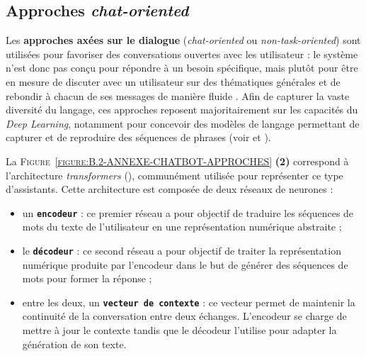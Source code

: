 		
		\subsection{Approches \textit{chat-oriented}}
		\label{annex:B.2.2-ANNEXE-CHATBOTS-APPROCHES-CHAT-ORIENTED}
			
			Les \textbf{approches axées sur le dialogue} (\textit{chat-oriented} ou \textit{non-task-oriented}) sont utilisées pour favoriser des conversations ouvertes avec les utilisateur : le système n'est donc pas conçu pour répondre à un besoin spécifique, mais plutôt pour être en mesure de discuter avec un utilisateur sur des thématiques générales et de rebondir à chacun de ses messages de manière fluide .
			Afin de capturer la vaste diversité du langage, ces approches reposent majoritairement sur les capacités du \textit{Deep Learning}, notamment pour concevoir des modèles de langage permettant de capturer et de reproduire des séquences de phrases (voir \cite{ni-etal:2022:recent-advances-deep} et \cite{kumar-etal:2016:ask-me-anything}).
			
			La \textsc{Figure~\ref{figure:B.2-ANNEXE-CHATBOT-APPROCHES}} \textbf{(2)} correspond à l'architecture \textit{transformers} (\cite{uszkoreit:2017:transformer-novel-neural}), communément utilisée pour représenter ce type d'assistants.
			Cette architecture est composée de deux réseaux de neurones :
			\begin{itemize}
				\item un \textcolor{colorCarrotOrange}{\textbf{\texttt{encodeur}}} :
					ce premier réseau a pour objectif de traduire les séquences de mots du texte de l'utilisateur en une représentation numérique abstraite ;
				\item le \textcolor{colorSilverLakeBlue}{\textbf{\texttt{décodeur}}} :
					ce second réseau a pour objectif de traiter la représentation numérique produite par l'encodeur dans le but de générer des séquences de mots pour former la réponse ;
				\item entre les deux, un \textcolor{colorDarkPastelGreen}{\textbf{\texttt{vecteur de contexte}}} :
					ce vecteur permet de maintenir la continuité de la conversation entre deux échanges.
					L'encodeur se charge de mettre à jour le contexte tandis que le décodeur l'utilise pour adapter la génération de son texte.
			\end{itemize}
			

